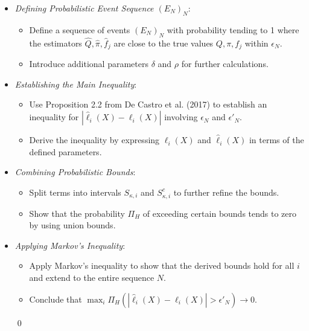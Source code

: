 \documentclass[10pt, aspectratio=169]{beamer}
\begin{document}
\begin{frame}
\begin{itemize}[label=\scalebox{0.5}{$\bullet$}]
    \setlength{\itemsep}{\baselineskip}
    \item \textit{Defining Probabilistic Event Sequence \((E_N)_N\)}:
        \begin{itemize}[label=\scalebox{0.5}{$\bullet$}]
            \setlength{\itemsep}{\baselineskip}
            \item Define a sequence of events \((E_N)_N\) with probability tending to 1 where the estimators \(\hat{Q}, \hat{\pi}, \hat{f}_j\) are close to the true values \(Q, \pi, f_j\) within \(\epsilon_N\).
            \item Introduce additional parameters \(\delta\) and \(\rho\) for further calculations.
        \end{itemize}

        \item \textit{Establishing the Main Inequality}:
        \begin{itemize}[label=\scalebox{0.5}{$\bullet$}]
            \setlength{\itemsep}{\baselineskip}
            \item Use Proposition 2.2 from De Castro et al. (2017) to establish an inequality for \(|\hat{\ell}_i(X) - \ell_i(X)|\) involving \(\epsilon_N\) and \(\epsilon'_N\).
            \item Derive the inequality by expressing \(\ell_i(X)\) and \(\hat{\ell}_i(X)\) in terms of the defined parameters.
        \end{itemize}

        
    \end{itemize}
\end{frame}
\begin{frame}
\begin{itemize}[label=\scalebox{0.5}{$\bullet$}]
    \item \textit{Combining Probabilistic Bounds}:
        \begin{itemize}[label=\scalebox{0.5}{$\bullet$}]
            \setlength{\itemsep}{\baselineskip}
            \item Split terms into intervals \(S_{\kappa,i}\) and \(S^c_{\kappa,i}\) to further refine the bounds.
            \item Show that the probability \(\Pi_H\) of exceeding certain bounds tends to zero by using union bounds.
        \end{itemize}
    \setlength{\itemsep}{\baselineskip}
    \item \textit{Applying Markov's Inequality}:
        \begin{itemize}[label=\scalebox{0.5}{$\bullet$}]
            \setlength{\itemsep}{\baselineskip}
            \item Apply Markov's inequality to show that the derived bounds hold for all \(i\) and extend to the entire sequence \(N\).
            \item Conclude that \(\max_{i} \Pi_H(|\hat{\ell}_i(X) - \ell_i(X)| > \epsilon'_N) \to 0\).
        \end{itemize} \qed
\end{itemize}
\end{frame}
\end{document}
